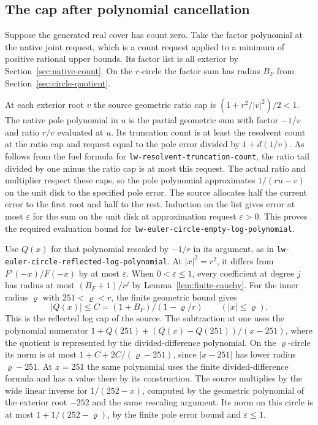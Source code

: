 \documentclass[11pt]{amsart}
\theoremstyle{definition}
\theoremstyle{remark}
\numberwithin{equation}{section}
\newcommand{\code}[1]{\nolinkurl{#1}}
\begin{document}
\subsection{The cap after polynomial cancellation}

Suppose the generated real cover has count zero.
Take the factor polynomial at the native joint
request, which is a count request applied to a
minimum of positive rational upper bounds. Its factor
list is all exterior by Section~\ref{sec:native-count}.
On the $r$-circle the factor sum has radius $B_F$
from Section~\ref{sec:circle-quotient}.

At each exterior root $v$ the source geometric ratio
cap is $(1+r^2/|v|^2)/2<1$. The native pole polynomial
in $u$ is the partial geometric sum with factor $-1/v$
and ratio $r/v$ evaluated at $u$. Its truncation
count is at least the resolvent count at the ratio cap
and request equal to the pole error divided by
$1+d(1/v)$. As follows from the fuel formula for
\code{lw-resolvent-truncation-count}, the ratio tail
divided by one minus the ratio cap is at most this
request. The actual ratio and multiplier respect these
caps, so the pole polynomial approximates
$1/(ru-v)$ on the unit disk to the specified pole error.
The source allocates half the current error to the first
root and half to the rest. Induction on the list gives
error at most $\varepsilon$ for the sum on the unit disk
at approximation request $\varepsilon>0$.
This proves the required evaluation bound for
\code{lw-euler-circle-empty-log-polynomial}.

Use $Q(x)$ for that polynomial rescaled by $-1/r$ in
its argument, as in
\code{lw-euler-circle-reflected-log-polynomial}.
At $|x|^2=r^2$, it differs from $F'(-x)/F(-x)$ by at
most $\varepsilon$. When $0<\varepsilon\le1$, every
coefficient at degree $j$ has radius at most
$(B_F+1)/r^j$ by Lemma~\ref{lem:finite-cauchy}.
For the inner radius $\varrho$ with $251<\varrho<r$,
the finite geometric bound gives
\[
        |Q(x)|\le C=(1+B_F)/(1-\varrho/r)
                      \qquad (|x|\le\varrho).
\]
This is the reflected log cap of the source.
The subtraction at one uses the polynomial numerator
$1+Q(251)+(Q(x)-Q(251))/(x-251)$, where the quotient
is represented by the divided-difference polynomial.
On the $\varrho$-circle its norm is at most
$1+C+2C/(\varrho-251)$, since $|x-251|$ has
lower radius $\varrho-251$.
At $x=251$ the same polynomial uses the finite
divided-difference formula and has a value there by
its construction. The source multiplies by the
wide linear inverse for $1/(252-x)$, computed by the
geometric polynomial of the exterior root $-252$ and
the same rescaling argument. Its norm on this circle is
at most $1+1/(252-\varrho)$, by the finite pole error
bound and $\varepsilon\le1$.
\end{document}
